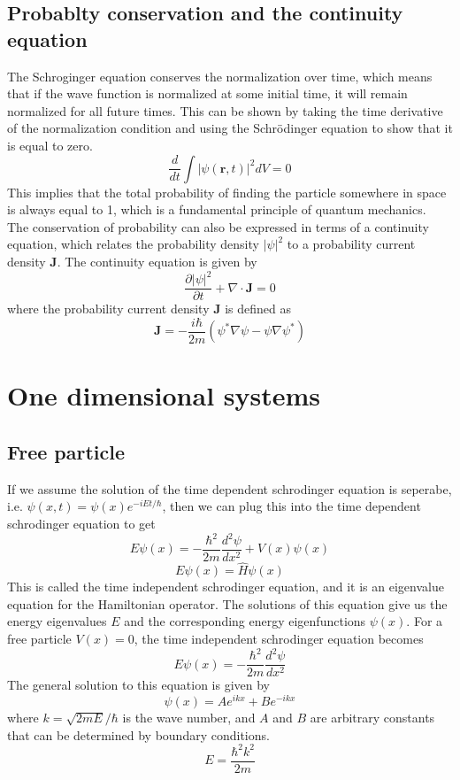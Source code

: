 \documentclass{article}
\begin{document}
\subsection{Probablty conservation and the continuity equation}
The Schroginger equation conserves the normalization over time, which means that if the wave function is normalized at some initial time, it will remain normalized for all future times. This can be shown by taking the time derivative of the normalization condition and using the Schrödinger equation to show that it is equal to zero.
\[\frac{d}{dt}\int |\psi (\mathbf{r},t)|^2 dV = 0\]
This implies that the total probability of finding the particle somewhere in space is always equal to 1, which is a fundamental principle of quantum mechanics.
\\ The conservation of probability can also be expressed in terms of a continuity equation, which relates the probability density $|\psi|^2$ to a probability current density $\mathbf{J}$. The continuity equation is given by
\[\frac{\partial |\psi|^2}{\partial t} + \nabla \cdot \mathbf{J} = 0\]
where the probability current density $\mathbf{J}$ is defined as 
\[\mathbf{J} = -\frac{i\hbar}{2m}(\psi^* \nabla \psi - \psi \nabla \psi^*)\] 
\newpage 
\section{One dimensional systems}
\subsection{Free particle}
If we assume the solution of the time dependent schrodinger equation is seperabe, i.e. $\psi(x,t) = \psi(x)e^{-iEt/\hbar}   $, then we can plug this into the time dependent schrodinger equation to get
\[E\psi(x) = -\frac{\hbar^2}{2m}\frac{d^2\psi}{dx^2} + V(x)\psi(x)\]
\[
E\psi(x)=\hat H \psi(x)
\]
This is called the time independent schrodinger equation, and it is an eigenvalue equation for the Hamiltonian operator. The solutions of this equation give us the energy eigenvalues $E$ and the corresponding energy eigenfunctions $\psi(x)$.
For a free particle $V(x)=0$, the time independent schrodinger equation becomes
\[      E\psi(x) = -\frac{\hbar^2}{2m}\frac{d^2\psi}{dx^2}\]
The general solution to this equation is given by       
\[\psi(x) = Ae^{ikx} + Be^{-ikx}\]
where $k = \sqrt{2mE}/\hbar$ is the wave number, and $A$ and $B$ are arbitrary constants that can be determined by boundary conditions.
\[
E=\frac{\hbar^2 k^2}{2m    }
\]
\end{document}
